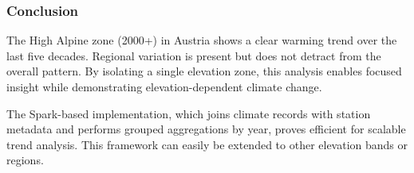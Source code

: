 \subsubsection{Conclusion}
The High Alpine zone (2000+) in Austria shows a clear warming trend over the last five decades. Regional variation is present but does not detract from the overall pattern. By isolating a single elevation zone, this analysis enables focused insight while demonstrating elevation-dependent climate change.

The Spark-based implementation, which joins climate records with station metadata and performs grouped aggregations by year, proves efficient for scalable trend analysis. This framework can easily be extended to other elevation bands or regions.
